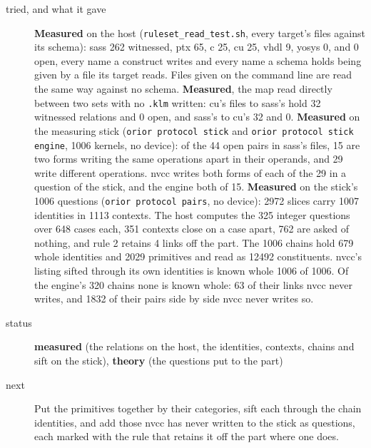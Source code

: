 \begin{description}
\item[{tried, and what it gave}] \textbf{Measured} on the host (\texttt{ruleset\_\allowbreak{}read\_\allowbreak{}test.\allowbreak{}sh}, every target's files against its schema): sass 262 witnessed, ptx 65, c 25, cu 25, vhdl 9, yosys 0, and 0 open, every name a construct writes and every name a schema holds being given by a file its target reads. Files given on the command line are read the same way against no schema. \textbf{Measured}, the map read directly between two sets with no \texttt{.\allowbreak{}klm} written: cu's files to sass's hold 32 witnessed relations and 0 open, and sass's to cu's 32 and 0. \textbf{Measured} on the measuring stick (\texttt{orior protocol stick} and \texttt{orior protocol stick engine}, 1006 kernels, no device): of the 44 open pairs in sass's files, 15 are two forms writing the same operations apart in their operands, and 29 write different operations. nvcc writes both forms of each of the 29 in a question of the stick, and the engine both of 15. \textbf{Measured} on the stick's 1006 questions (\texttt{orior protocol pairs}, no device): 2972 slices carry 1007 identities in 1113 contexts. The host computes the 325 integer questions over 648 cases each, 351 contexts close on a case apart, 762 are asked of nothing, and rule 2 retains 4 links off the part. The 1006 chains hold 679 whole identities and 2029 primitives and read as 12492 constituents. nvcc's listing sifted through its own identities is known whole 1006 of 1006. Of the engine's 320 chains none is known whole: 63 of their links nvcc never writes, and 1832 of their pairs side by side nvcc never writes so.
\item[{status}] \textbf{measured} (the relations on the host, the identities, contexts, chains and sift on the stick), \textbf{theory} (the questions put to the part)
\item[{next}] Put the primitives together by their categories, sift each through the chain identities, and add those nvcc has never written to the stick as questions, each marked with the rule that retains it off the part where one does.
\end{description}

